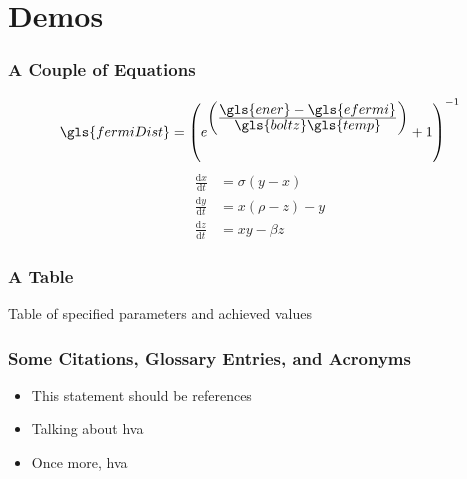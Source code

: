 \documentclass{beamer}
\newcommand\ddfrac[2]{\frac{\displaystyle #1}{\displaystyle #2}}
\begin{document}
    \section{Demos}
        \begin{frame}
            \frametitle{A Couple of Equations}
            \begin{equation}
                \gls{fermiDist} = \left(e^{\left(\ddfrac{\gls{ener}-\gls{efermi}}{\gls{boltz}\gls{temp}}\right)}+1\right)^{-1}
                \label{eqt:fermiDirac}
            \end{equation}
            \begin{align}
                \frac{\text{d}x}{\text{d}t} &= \sigma (y-x)\\
                \frac{\text{d}y}{\text{d}t} &= x(\rho -z)-y\\
                \frac{\text{d}z}{\text{d}t} &= xy-\beta z
            \end{align}
        \end{frame}
        \begin{frame}
            \frametitle{A Table}
            \begin{table}[H]
                \centering
                \caption{Table of specified parameters and achieved values}
                \vspace{0.1cm}
                \label{Table:Parameters}
            \end{table}
        \end{frame}
        \begin{frame}
            \frametitle{Some Citations, Glossary Entries, and Acronyms}
            \begin{itemize}
                \item This statement should be references \cite{acc:1}
                \item Talking about \gls{hva}
                \item Once more, \gls{hva}
            \end{itemize}
        \end{frame}
\end{document}
